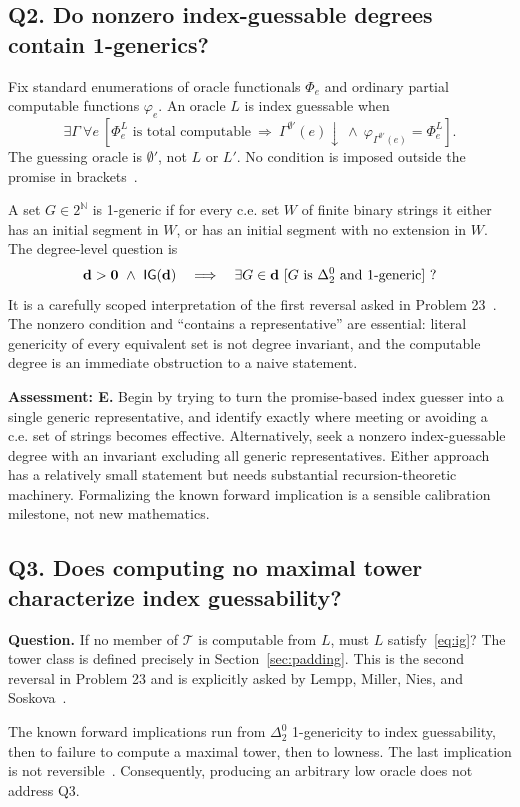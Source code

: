 \documentclass[11pt,a4paper]{article}
\newcommand{\N}{\mathbb N}
\newcommand{\T}{\mathcal T}\newcommand{\TF}{\mathcal{TF}}\newcommand{\Tw}{\mathcal T^{-}}
\newcommand{\problem}[2]{\subsection{#1. #2}\label{entry:#1}}
\theoremstyle{definition}\newtheorem{definition}[theorem]{Definition}
\theoremstyle{remark}\newtheorem{remark}[theorem]{Remark}
\begin{document}
\problem{Q2}{Do nonzero index-guessable degrees contain 1-generics?}
Fix standard enumerations of oracle functionals $\Phi_e$ and ordinary partial
computable functions $\varphi_e$. An oracle $L$ is index guessable when
\begin{equation}
 \exists\Gamma\ \forall e\ 
 [\Phi_e^L\text{ is total computable}\ \Longrightarrow\
 \Gamma^{\emptyset'}(e)\downarrow\ \land\
 \varphi_{\Gamma^{\emptyset'}(e)}=\Phi_e^L].
 \label{eq:ig}
\end{equation}
The guessing oracle is $\emptyset'$, not $L$ or $L'$. No condition is imposed
outside the promise in brackets~\cite{LMNS}.

A set $G\in2^{\N}$ is 1-generic if for every c.e. set $W$ of finite binary
strings it either has an initial segment in $W$, or has an initial segment
with no extension in $W$. The degree-level question is
\[
 \mathbf d>\mathbf0\ \land\ \IG(\mathbf d)
 \quad\Longrightarrow\quad
 \exists G\in\mathbf d\ [G\text{ is }\Delta^0_2\text{ and 1-generic}]\ ?
\]
It is a carefully scoped interpretation of the first reversal asked in
Problem 23~\cite{Workshop25}. The nonzero condition and ``contains a
representative'' are essential: literal genericity of every equivalent set is
not degree invariant, and the computable degree is an immediate obstruction
to a naive statement.

\textbf{Assessment: E.} Begin by trying to turn the promise-based index guesser
into a single generic representative, and identify exactly where meeting or
avoiding a c.e. set of strings becomes effective. Alternatively, seek a
nonzero index-guessable degree with an invariant excluding all generic
representatives. Either approach has a relatively small statement but needs
substantial recursion-theoretic machinery. Formalizing the known forward
implication is a sensible calibration milestone, not new mathematics.

\problem{Q3}{Does computing no maximal tower characterize index guessability?}
\textbf{Question.} If no member of $\T$ is computable from $L$, must $L$
satisfy~\eqref{eq:ig}? The tower class is defined precisely in
Section~\ref{sec:padding}. This is the second reversal in Problem 23 and is
explicitly asked by Lempp, Miller, Nies, and Soskova~\cite{LMNS,Workshop25}.

The known forward implications run from $\Delta^0_2$ 1-genericity to index
guessability, then to failure to compute a maximal tower, then to lowness.
The last implication is not reversible~\cite{LMNS}. Consequently, producing
an arbitrary low oracle does not address Q3.
\end{document}
